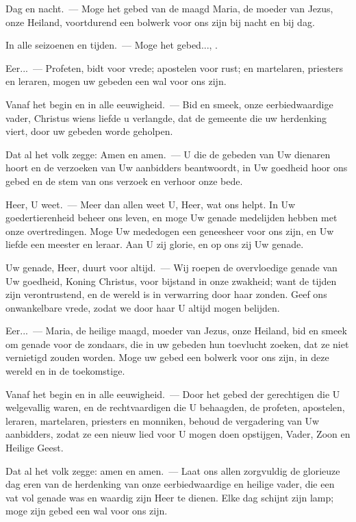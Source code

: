 \documentclass[12pt,twoside,a5paper]{article}
\begin{document}
\begin{halfparskip}
   Dag en nacht.~--- Moge het gebed van de maagd Maria, de moeder van Jezus, onze Heiland, voortdurend een bolwerk voor ons zijn bij nacht en bij dag.

  In alle seizoenen en tijden.~--- Moge het gebed..., .

  Eer...~--- Profeten, bidt voor vrede; apostelen voor rust; en martelaren, priesters en leraren, mogen uw gebeden een wal voor ons zijn.

  Vanaf het begin en in alle eeuwigheid.~--- Bid en smeek, onze eerbiedwaardige vader, Christus wiens liefde u verlangde, dat de gemeente die uw herdenking viert, door uw gebeden worde geholpen.

  Dat al het volk zegge: Amen en amen.~--- U die de gebeden van Uw dienaren hoort en de verzoeken van Uw aanbidders beantwoordt, in Uw goedheid hoor ons gebed en de stem van ons verzoek en verhoor onze bede.
\end{halfparskip}

\begin{halfparskip}
   Heer, U weet.~--- Meer dan allen weet U, Heer, wat ons helpt. In Uw goedertierenheid beheer ons leven, en moge Uw genade medelijden hebben met onze overtredingen. Moge Uw mededogen een geneesheer voor ons zijn, en Uw liefde een meester en leraar. Aan U zij glorie, en op ons zij Uw genade.

  Uw genade, Heer, duurt voor altijd.~--- Wij roepen de overvloedige genade van Uw goedheid, Koning Christus, voor bijstand in onze zwakheid; want de tijden zijn verontrustend, en de wereld is in verwarring door haar zonden. Geef ons onwankelbare vrede, zodat we door haar U altijd mogen belijden.

  Eer...~--- Maria, de heilige maagd, moeder van Jezus, onze Heiland, bid en smeek om genade voor de zondaars, die in uw gebeden hun toevlucht zoeken, dat ze niet vernietigd zouden worden. Moge uw gebed een bolwerk voor ons zijn, in deze wereld en in de toekomstige.

  Vanaf het begin en in alle eeuwigheid.~--- Door het gebed der gerechtigen die U welgevallig waren, en de rechtvaardigen die U behaagden, de profeten, apostelen, leraren, martelaren, priesters en monniken, behoud de vergadering van Uw aanbidders, zodat ze een nieuw lied voor U mogen doen opstijgen, Vader, Zoon en Heilige Geest.

  Dat al het volk zegge: amen en amen.~--- Laat ons allen zorgvuldig de glorieuze dag eren van de herdenking van onze eerbiedwaardige en heilige vader, die een vat vol genade was en waardig zijn Heer te dienen. Elke dag schijnt zijn lamp; moge zijn gebed een wal voor ons zijn.
\end{halfparskip}
\end{document}
